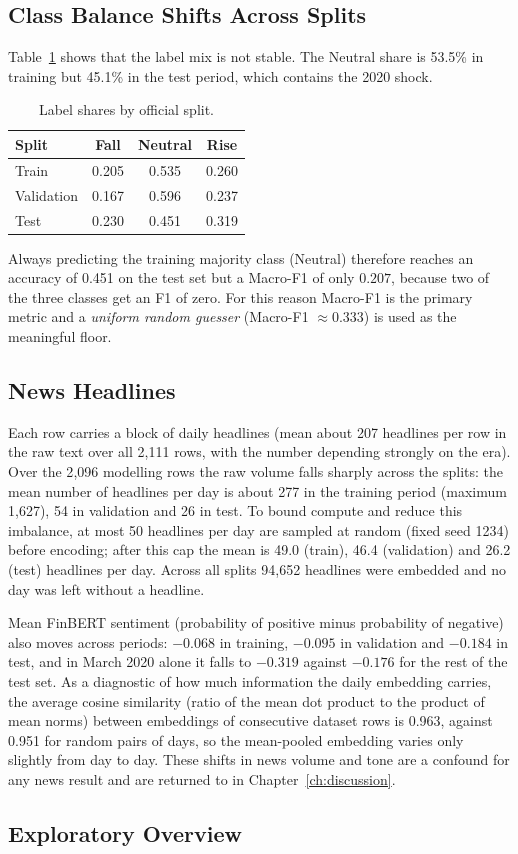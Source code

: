 \subsection{Class Balance Shifts Across Splits}
Table~\ref{tab:classes} shows that the label mix is not stable. The Neutral share is 53.5\% in training but 45.1\% in the test period, which contains the 2020 shock.
\begin{table}[H]
\centering
\begin{tabular}{lccc}
\toprule
Split & Fall & Neutral & Rise\\
\midrule
Train & 0.205 & 0.535 & 0.260\\
Validation & 0.167 & 0.596 & 0.237\\
Test & 0.230 & 0.451 & 0.319\\
\bottomrule
\end{tabular}
\caption{Label shares by official split.}\label{tab:classes}
\end{table}
Always predicting the training majority class (Neutral) therefore reaches an accuracy of 0.451 on the test set but a Macro-F1 of only $0.207$, because two of the three classes get an F1 of zero. For this reason Macro-F1 is the primary metric and a \emph{uniform random guesser} (Macro-F1 $\approx0.333$) is used as the meaningful floor.

\subsection{News Headlines}
Each row carries a block of daily headlines (mean about 207 headlines per row in the raw text over all 2{,}111 rows, with the number depending strongly on the era). Over the 2{,}096 modelling rows the raw volume falls sharply across the splits: the mean number of headlines per day is about 277 in the training period (maximum 1{,}627), 54 in validation and 26 in test. To bound compute and reduce this imbalance, at most 50 headlines per day are sampled at random (fixed seed 1234) before encoding; after this cap the mean is 49.0 (train), 46.4 (validation) and 26.2 (test) headlines per day. Across all splits 94{,}652 headlines were embedded and no day was left without a headline.

Mean FinBERT sentiment (probability of positive minus probability of negative) also moves across periods: $-0.068$ in training, $-0.095$ in validation and $-0.184$ in test, and in March 2020 alone it falls to $-0.319$ against $-0.176$ for the rest of the test set. As a diagnostic of how much information the daily embedding carries, the average cosine similarity (ratio of the mean dot product to the product of mean norms) between embeddings of consecutive dataset rows is 0.963, against 0.951 for random pairs of days, so the mean-pooled embedding varies only slightly from day to day. These shifts in news volume and tone are a confound for any news result and are returned to in Chapter~\ref{ch:discussion}.

\subsection{Exploratory Overview}
